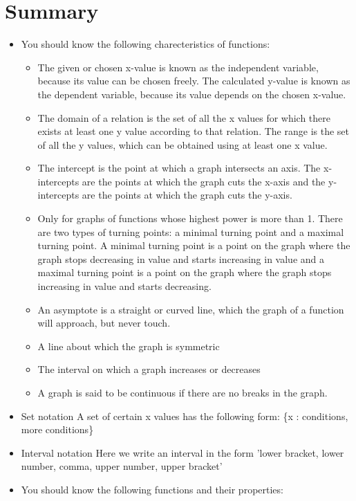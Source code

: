             \section{ Summary}
            \nopagebreak
            \label{m39348*eip-408}\begin{itemize}[noitemsep]
            \item You should know the following charecteristics of functions: \label{m39348*id69342}\begin{itemize}[noitemsep]
            \item The given or chosen x-value is known as the independent variable, because its value can be chosen freely. The calculated y-value is known as the dependent variable, because its value depends on the chosen x-value.\item The domain of a relation is the set of all the x values for which there exists at least one y value according to that relation. The range is the set of all the y values, which can be obtained using at least one x value.\item The intercept is the point at which a graph intersects an axis. The x-intercepts are the points at which the graph cuts the x-axis and the y-intercepts are the points at which the graph cuts the y-axis. \item Only for graphs of functions whose highest power is more than 1. There are two types of turning points: a minimal turning point and a maximal turning point. A minimal turning point is a point on the graph where the graph stops decreasing in value and starts increasing in value and a maximal turning point is a point on the graph where the graph stops increasing in value and starts decreasing. \item An asymptote is a straight or curved line, which the graph of a function will approach, but never touch.\item A line about which the graph is symmetric\item  The interval on which a graph increases or decreases\item A graph is said to be continuous if there are no breaks in the graph. \end{itemize}
        \item 
Set notation
	A set of certain x values has the following form: \{x : conditions, more conditions\}\item 
Interval notation
	Here we write an interval in the form 'lower bracket, lower number, comma, upper number, upper bracket'\item  You should know the following functions and their properties:\label{m39348*id679348}\begin{itemize}[noitemsep]

\end{itemize}
\end{itemize}

